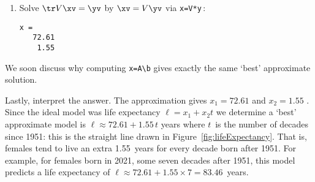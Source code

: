 \begin{example}
\begin{solution}
\begin{enumerate}
\item Solve \(\tr V\xv=\yv\) by \(\xv=V\yv\) via \verb|x=V*y|\,:
\begin{verbatim}
x =
   72.61
    1.55
\end{verbatim}
\end{enumerate}
We soon discuss why computing \verb|x=A\b| gives exactly the same `best' approximate solution. 

Lastly, interpret the answer.
The approximation gives \(x_1=72.61\) and \(x_2=1.55\) \twodp.  
Since the ideal model was life expectancy \(\ell=x_1+x_2t\) we  determine a `best' approximate model is \(\ell\approx72.61+1.55\,t\) years where \(t\)~is the number of decades since 1951: this is the straight line drawn in Figure~\ref{fig:lifeExpectancy}.
That is, females tend to live an extra 1.55~years for every decade born after 1951.
For example, for females born in 2021, some seven decades after 1951, this model predicts a life expectancy of \(\ell\approx72.61+1.55\times7=83.46\)~years.
\end{solution}
\end{example}



